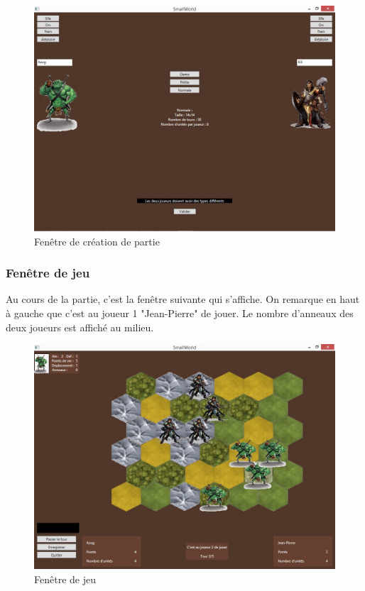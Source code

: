 \begin{figure}[ht!]
\centering
\includegraphics[scale=0.65]{img/crea.jpg}
\caption{Fenêtre de création de partie}
\end{figure}
\newpage


\subsubsection{Fenêtre de jeu}
Au cours de la partie, c'est la fenêtre suivante qui s'affiche. On remarque en haut à gauche que c'est au joueur 1 "Jean-Pierre" de jouer. Le nombre d'anneaux des deux joueurs est affiché au milieu.

\begin{figure}[ht!]
\centering
\includegraphics[scale=0.50]{img/jeu.jpg}
\caption{Fenêtre de jeu}
\end{figure}
\newpage

